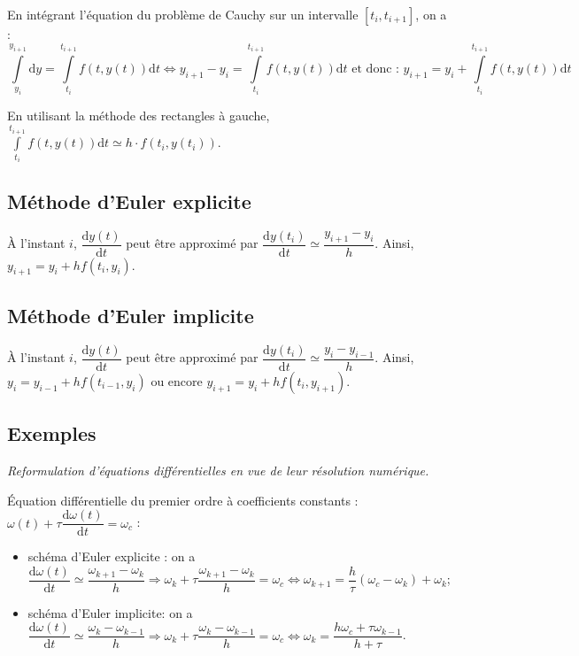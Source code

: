 \documentclass[10pt,fleqn]{article} %
\begin{document}
\begin{resultat}
En intégrant l'équation du problème de Cauchy sur un intervalle $[t_i, t_{i+1}]$, on a : 
$$
\int\limits_{y_i}^{y_{i+1}} \text{d}y = \int\limits_{t_i}^{t_{i+1}} f(t,y(t)) \text{d}t 
\Longleftrightarrow 
y_{i+1} - y_i = \int\limits_{t_i}^{t_{i+1}} f(t,y(t)) \text{d}t  \text{ et donc : }  y_{i+1}= y_i + \int\limits_{t_i}^{t_{i+1}} f(t,y(t)) \text{d}t 
$$

 En utilisant la méthode des rectangles à gauche, $\int\limits_{t_i}^{t_{i+1}} f(t,y(t)) \text{d}t  \simeq h \cdot f(t_i,y(t_i)) $.

\end{resultat}


\subsection*{Méthode d'Euler explicite}

À l'instant $i$, $\dfrac{\text{d}y(t)}{\text{d}t}$ peut être approximé par 
$\dfrac{\text{d}y(t_i)}{\text{d}t} \simeq \dfrac{y_{i+1}-y_i}{h}$.
Ainsi, $y_{i+1} = y_i +h  f(t_i,y_i)$.

\subsection*{Méthode d'Euler implicite}
À l'instant $i$, $\dfrac{\text{d}y(t)}{\text{d}t}$ peut être approximé par 
$\dfrac{\text{d}y(t_{i})}{\text{d}t} \simeq \dfrac{y_{i}-y_{i-1}}{h}$.
Ainsi, $y_{i} = y_{i-1} +h  f(t_{i-1},y_{i})$ ou encore $y_{i+1} = y_{i} +h  f(t_{i},y_{i+1})$.

\subsection*{Exemples}
\textit{Reformulation d'équations différentielles en vue de leur résolution numérique.}


Équation différentielle du premier ordre à coefficients constants : $\omega(t) + \tau \dfrac{\text{d} \omega(t)}{\text{d}t} = \omega_c $ :
\begin{itemize}
\item schéma d'Euler explicite : on a $\dfrac{\text{d} \omega(t)}{\text{d}t}\simeq \dfrac{\omega_{k+1}-\omega_k}{h} \Rightarrow  \omega_k + \tau  \dfrac{\omega_{k+1}-\omega_k}{h} = \omega_c  \Leftrightarrow \omega_{k+1} =\dfrac{h}{\tau} \left(\omega_c - \omega_k\right)+\omega_k$;
\item schéma d'Euler implicite: on a $\dfrac{\text{d} \omega(t)}{\text{d}t}\simeq \dfrac{\omega_{k}-\omega_{k-1}}{h} \Rightarrow  \omega_k + \tau  \dfrac{\omega_{k}-\omega_{k-1}}{h} = \omega_c  \Leftrightarrow   \omega_k = \dfrac{h\omega_c + \tau\omega_{k-1}}{h+\tau} $.

\end{itemize}
\end{document}
